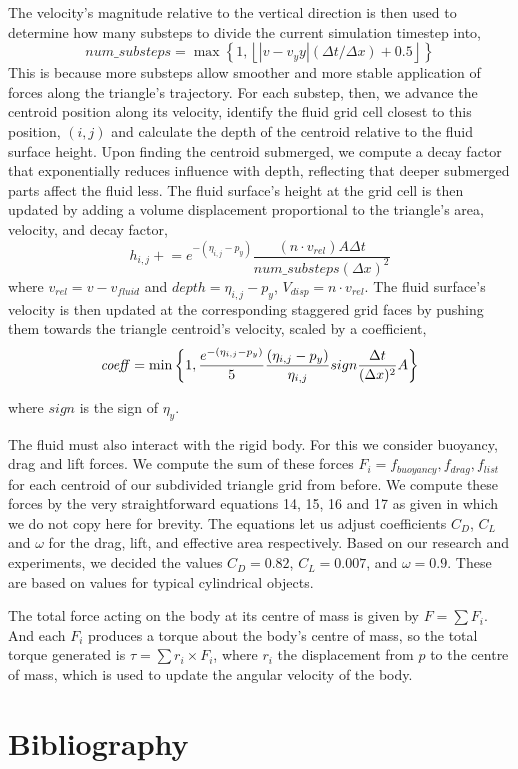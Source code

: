 The velocity's magnitude relative to the vertical direction is then used to determine how many substeps to divide the current simulation timestep into,
$$num\_substeps = \max\left\{1, \left\lfloor |v- v_y y| (\Delta t/\Delta x) + 0.5 \right\rfloor\right\}$$
This is because more substeps allow smoother and more stable application of forces along the triangle’s trajectory.
For each substep, then, we advance the centroid position along its velocity, identify the fluid grid cell closest to this position, $(i,j)$ and calculate the depth of the centroid relative to the fluid surface height.
Upon finding the centroid submerged, we compute a decay factor that exponentially reduces influence with depth, reflecting that deeper submerged parts affect the fluid less.
The fluid surface's height at the grid cell is then updated by adding a volume displacement proportional to the triangle’s area, velocity, and decay factor,
$$h_{i,j} \mathrel{+}= e^{-(\eta_{i,j}-p_y)} \frac{(n \cdot v_{rel}) A \Delta t}{num\_substeps(\Delta x)^2}$$
where $v_{rel} = v - v_{fluid}$ and $depth=\eta_{i,j}-p_y$, $V_{disp} =n \cdot v_{rel}$.
The fluid surface's velocity is then updated at the corresponding staggered grid faces by pushing them towards the triangle centroid's velocity, scaled by a coefficient,
$$\text{\textit{coeff}} = \min\left\{1, \frac{e^{-(\eta_{i,j}-p_y)}}5 \frac{(\eta_{i,j}-p_y)}{\eta_{i,j}} sign \frac{\Delta t}{(\Delta x)^2} A \right\}$$

where $sign$ is the sign of $\eta_y$.

The fluid must also interact with the rigid body.
For this we consider buoyancy, drag and lift forces.
We compute the sum of these forces $F_i = f_{buoyancy}, f_{drag}, f_{list}$ for each centroid of our subdivided triangle grid from before. We compute these forces by the very straightforward equations 14, 15, 16 and 17 as given in \cite{hfluid} which we do not copy here for brevity. The equations let us adjust coefficients $C_D$, $C_L$ and $\omega$ for the drag, lift, and effective area respectively. Based on our research and experiments, we decided the values $C_D = 0.82$, $C_L = 0.007$, and $\omega = 0.9$. These are based on values for typical cylindrical objects.

The total force acting on the body at its centre of mass is given by $F = \sum F_i$.
And each $F_i$ produces a torque about the body's centre of mass, so the total torque generated is $\tau = \sum r_i \times F_i$, where $r_i$ the displacement from $p$ to the centre of mass, which is used to update the angular velocity of the body.

\newpage

\section{Bibliography}
\printbibliography[heading=none]
    

